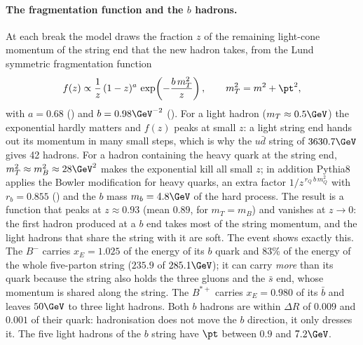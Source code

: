 \paragraph{The fragmentation function and the $b$ hadrons.}
At each break the model draws the fraction $z$ of the remaining light-cone momentum of the string end that
the new hadron takes, from the Lund symmetric fragmentation function
\[
  f(z) \propto \frac{1}{z}\,(1-z)^{a}\,\exp\!\left(-\frac{b\,m_T^2}{z}\right),\qquad
  m_T^2 = m^2 + \pt^2 ,
\]
with $a=0.68$ () and $b=0.98\GeV^{-2}$ (). For a light hadron
($m_T\approx0.5\GeV$) the exponential hardly matters and $f(z)$ peaks at small $z$: a light string end hands
out its momentum in many small steps, which is why the $u\bar d$ string of $3630.7\GeV$ gives 42 hadrons. For a
hadron containing the heavy quark at the string end, $m_T^2\approx m_B^2\approx28\GeV^2$ makes the exponential
kill all small $z$; in addition Pythia8 applies the Bowler modification for heavy quarks, an extra factor
$1/z^{\,r_Q\,b\,m_Q^2}$ with $r_b=0.855$ () and the $b$ mass $m_b=4.8\GeV$ of the hard
process. The result is a function that peaks at $z\approx0.93$ (mean $0.89$, for $m_T=m_B$) and vanishes at $z\to0$: the first
hadron produced at a $b$ end takes most of the string momentum, and the light hadrons that share the string
with it are soft. The event shows exactly this. The $B^-$ carries $x_E=1.025$ of the energy of its $b$ quark
and 83\% of the energy of the whole five-parton string ($235.9$ of $285.1\GeV$); it can carry \emph{more} than
its quark because the string also holds the three gluons and the $\bar s$ end, whose momentum is shared along
the string. The $B^{*+}$ carries $x_E=0.980$ of its $\bar b$ and leaves $50\GeV$ to three light hadrons. Both $b$
hadrons are within $\Delta R$ of $0.009$ and $0.001$ of their quark: hadronisation does not move the $b$
direction, it only dresses it. The five light hadrons of the $b$ string have $\pt$ between $0.9$ and
$7.2\GeV$.

